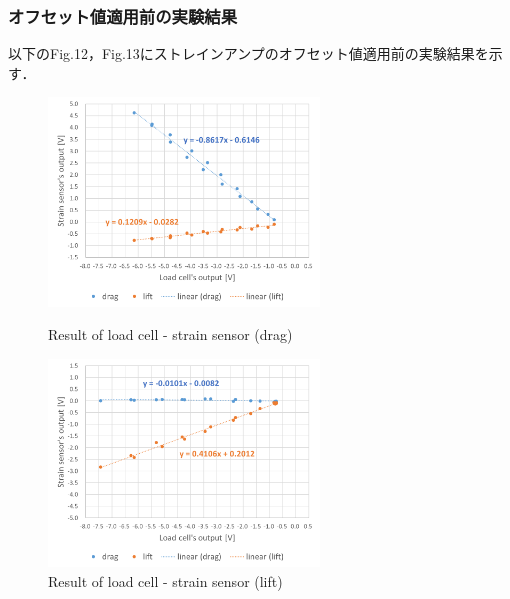 \documentclass[twocolumn,a4j]{jsarticle}
\begin{document}
\subsubsection*{オフセット値適用前の実験結果}
以下のFig.12，Fig.13にストレインアンプのオフセット値適用前の実験結果を示す．
\begin{figure}[htbp]
    \footnotesize
    \begin{center}
        \includegraphics[width=72mm]{../images/calibration_2_drag.png}
        \caption{Result of load cell - strain sensor (drag)}
        \includegraphics[width=72mm]{../images/calibration_2_lift.png}
        \caption{Result of load cell - strain sensor (lift)}
    \end{center}
\end{figure}

\newpage
\end{document}
